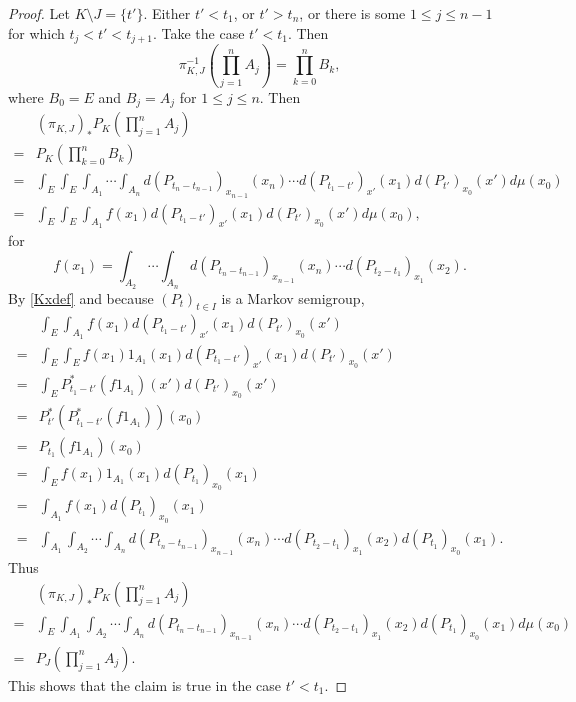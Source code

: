\documentclass{article}
\theoremstyle{definition}
\begin{document}
\begin{proof}
Let $K \setminus J = \{t'\}$. Either $t'<t_1$, or $t'>t_n$, or there is some $1 \leq j \leq n-1$
for which $t_j<t'<t_{j+1}$. Take the case $t'<t_1$. 
Then
\[
\pi_{K,J}^{-1}\left(\prod_{j=1}^n A_j\right) = \prod_{k=0}^n B_k,
\]
where $B_0=E$ and $B_j=A_j$ for $1 \leq j \leq n$. Then
\[
\begin{split}
&(\pi_{K,J})_* P_K\left(\prod_{j=1}^n A_j\right)\\
=&P_K\left(\prod_{k=0}^n B_k\right)\\
=&\int_E \int_E \int_{A_1} \cdots \int_{A_n} d(P_{t_n-t_{n-1}})_{x_{n-1}}(x_n)
\cdots d(P_{t_1-t'})_{x'}(x_1)
d(P_{t'})_{x_0}(x')
d\mu(x_0)\\
=&\int_E \int_E \int_{A_1} f(x_1) d(P_{t_1-t'})_{x'}(x_1) d(P_{t'})_{x_0}(x') d\mu(x_0),
\end{split}
\]
for
\[
f(x_1) = \int_{A_2} \cdots \int_{A_n} d(P_{t_n-t_{n-1}})_{x_{n-1}}(x_n)
\cdots d(P_{t_2-t_1})_{x_1}(x_2).
\]
By \eqref{Kxdef} and because $(P_t)_{t \in I}$ is a Markov semigroup,
\[
\begin{split}
&\int_E \int_{A_1} f(x_1) d(P_{t_1-t'})_{x'}(x_1) d(P_{t'})_{x_0}(x')\\
=&\int_E \int_E f(x_1) 1_{A_1}(x_1) d(P_{t_1-t'})_{x'}(x_1) d(P_{t'})_{x_0}(x')\\
=&\int_E P_{t_1-t'}^* (f 1_{A_1})(x') d(P_{t'})_{x_0}(x')\\
=&P_{t'}^*(P_{t_1-t'}^* (f 1_{A_1}))(x_0)\\
=&P_{t_1}(f 1_{A_1})(x_0)\\
=&\int_E f(x_1) 1_{A_1}(x_1) d(P_{t_1})_{x_0}(x_1)\\
=&\int_{A_1} f(x_1)  d(P_{t_1})_{x_0}(x_1)\\
=&\int_{A_1}  \int_{A_2} \cdots \int_{A_n} d(P_{t_n-t_{n-1}})_{x_{n-1}}(x_n)
\cdots d(P_{t_2-t_1})_{x_1}(x_2)d(P_{t_1})_{x_0}(x_1).
\end{split}
\]
Thus
\[
\begin{split}
&(\pi_{K,J})_* P_K\left(\prod_{j=1}^n A_j\right)\\
=&\int_E \int_{A_1}  \int_{A_2} \cdots \int_{A_n} d(P_{t_n-t_{n-1}})_{x_{n-1}}(x_n)
\cdots d(P_{t_2-t_1})_{x_1}(x_2)d(P_{t_1})_{x_0}(x_1) d\mu(x_0)\\
=&P_J\left(\prod_{j=1}^n A_j\right).
\end{split}
\]
This shows that the claim is true in the case $t'<t_1$.
\end{proof}
\end{document}
